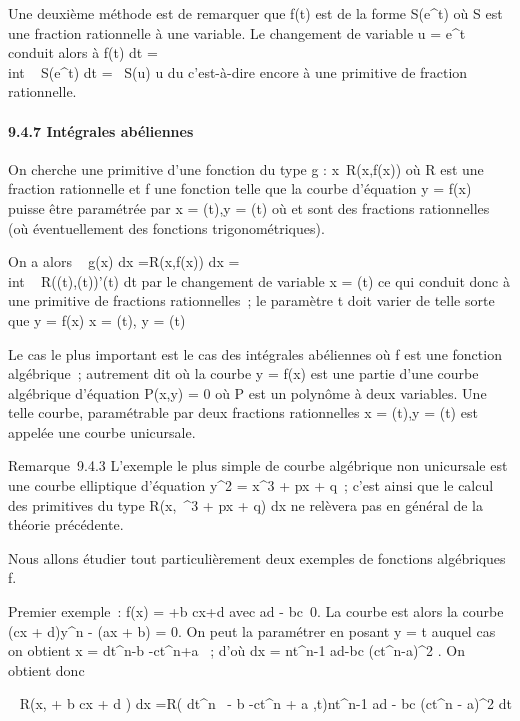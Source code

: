 Une deuxième méthode est de remarquer que f(t) est de la forme
S(e^t) où S est une fraction rationnelle à une variable. Le
changement de variable u = e^t conduit alors à
\int  f(t) dt =\\int ~
S(e^t) dt =\int ~  S(u)
\over u du c'est-à-dire encore à une primitive de
fraction rationnelle.

\paragraph{9.4.7 Intégrales abéliennes}

On cherche une primitive d'une fonction du type g :
x\mapsto~R(x,f(x)) où R est une fraction rationnelle
et f une fonction telle que la courbe d'équation y = f(x) puisse être
paramétrée par x = \phi(t),y = \psi(t) où \phi et \psi sont des fractions
rationnelles (où éventuellement des fonctions trigonométriques).

On a alors \int ~ g(x) dx
=\int  R(x,f(x)) dx =\\int ~
R(\phi(t),\psi(t))\phi'(t) dt par le changement de variable x = \phi(t) ce qui
conduit donc à une primitive de fractions rationnelles~; le paramètre t
doit varier de telle sorte que y = f(x) \Leftrightarrow x =
\phi(t), y = \psi(t)

Le cas le plus important est le cas des intégrales abéliennes où f est
une fonction algébrique~; autrement dit où la courbe y = f(x) est une
partie d'une courbe algébrique \Gamma d'équation P(x,y) = 0 où P est un
polynôme à deux variables. Une telle courbe, paramétrable par deux
fractions rationnelles x = \phi(t),y = \psi(t) est appelée une courbe
unicursale.

Remarque~9.4.3 L'exemple le plus simple de courbe algébrique non
unicursale est une courbe elliptique d'équation y^2 =
x^3 + px + q~; c'est ainsi que le calcul des primitives du
type \int  R(x,\sqrtx~^3
 + px + q) dx ne relèvera pas en général de la théorie précédente.

Nous allons étudier tout particulièrement deux exemples de fonctions
algébriques f.

Premier exemple~: f(x) = \rootn
\ofax+b \over cx+d  avec ad -
bc\neq~0. La courbe \Gamma est alors la courbe (cx +
d)y^n - (ax + b) = 0. On peut la paramétrer en posant y = t
auquel cas on obtient x = dt^n-b \over
-ct^n+a ~; d'où dx = nt^n-1 ad-bc
\over (ct^n-a)^2 . On obtient
donc

\int ~ R(x,\rootn
\ofax + b \over cx + d ) dx
=\int  R( dt^n~ - b
\over -ct^n + a ,t)nt^n-1 ad -
bc \over (ct^n - a)^2 dt

